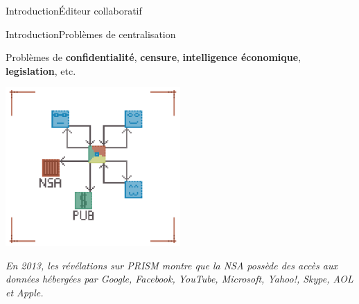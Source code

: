 \begin{frame}{Introduction}{Éditeur collaboratif}
  
  
\end{frame}


\begin{frame}{Introduction}{Problèmes de centralisation}
  
  Problèmes de \textbf{confidentialité}, \textbf{censure},
  \textbf{intelligence économique}, \textbf{legislation}, etc.

  \vspace{0.5cm}
  \begin{center}
    \includegraphics[width=0.5\textwidth]{img/centralizedethicproblems.png}
  \end{center}
  
  \vspace{0.5cm}

  \textit{En 2013, les révélations sur PRISM montre que la NSA possède des
    accès aux données hébergées par Google, Facebook, YouTube, Microsoft,
    Yahoo!, Skype, AOL et Apple.}

\end{frame}

